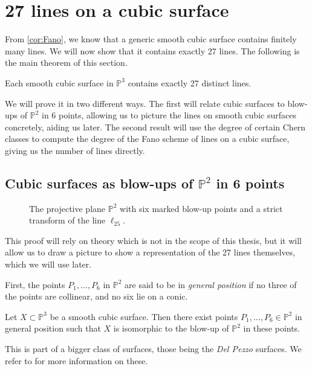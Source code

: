 \section{27 lines on a cubic surface}
From \cref{cor:Fano}, we know that a generic smooth cubic surface contains finitely many lines. We will now show that it contains exactly 27 lines. The following is the main theorem of this section.

\begin{theorem}\label{thm:27}
    Each smooth cubic surface in $\mathbb{P}^3$ contains exactly 27 distinct lines.
\end{theorem}

We will prove it in two different ways. The first will relate cubic surfaces to blow-ups of $\mathbb{P}^2$ in 6 points, allowing us to picture the lines on smooth cubic surfaces concretely, aiding us later. The second result will use the degree of certain Chern classes to compute the degree of the Fano scheme of lines on a cubic surface, giving us the number of lines directly.

\subsection{Cubic surfaces as blow-ups of \texorpdfstring{$\mathbb{P}^2$}{P2} in 6 points}





\begin{figure}%
    \centering
    
    \caption{The projective plane $\mathbb{P}^2$ with six marked blow-up points and a strict transform of the line $\ell_{25}$.}
    \label{fig:blowup6}
\end{figure}

This proof will rely on theory which is not in the scope of this thesis, but it will allow us to draw a picture to show a representation of the 27 lines themselves, which we will use later.

First, the points $P_1, \dots, P_6$ in $\mathbb{P}^2$ are said to be in \emph{general position} if no three of the points are collinear, and no six lie on a conic. 

\begin{proposition}[\cite{Ha77}, 4.7/4.7.3]\label{prop:blowup6}
    Let $X \subset \mathbb{P}^3$ be a smooth cubic surface. Then there exist points $P_1, \dots, P_6 \in \mathbb{P}^2$ in general position such that $X$ is isomorphic to the blow-up of $\mathbb{P}^2$ in these points.
\end{proposition}
This is part of a bigger class of surfaces, those being the \emph{Del Pezzo} surfaces. We refer to \cite[Chapter 4]{BEA96} for more information on these. 

